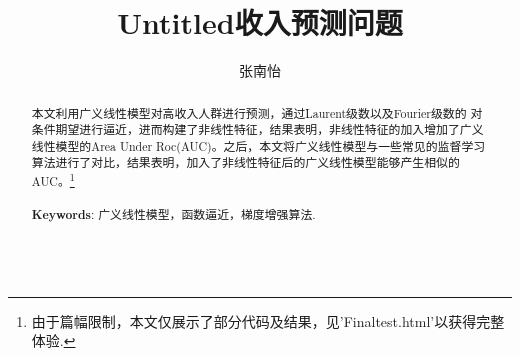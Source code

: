 \documentclass[12pt]{article}
\title{Untitled}
\begin{document}
\title{收入预测问题}
\author{ 张南怡}
\date{}
\maketitle
\begin{abstract}
本文利用广义线性模型对高收入人群进行预测，通过Laurent级数以及Fourier级数的
对条件期望进行逼近，进而构建了非线性特征，结果表明，非线性特征的加入增加了广义线性模型的Area Under Roc(AUC)。之后，本文将广义线性模型与一些常见的监督学习算法进行了对比，结果表明，加入了非线性特征后的广义线性模型能够产生相似的AUC。\footnote{由于篇幅限制，本文仅展示了部分代码及结果，见'Finaltest.html'以获得完整体验.}
\\ \ \\
	{\bf Keywords}: 广义线性模型，函数逼近，梯度增强算法.\\ \\


\end{abstract}
 \newpage
 \tableofcontents
\end{document}
